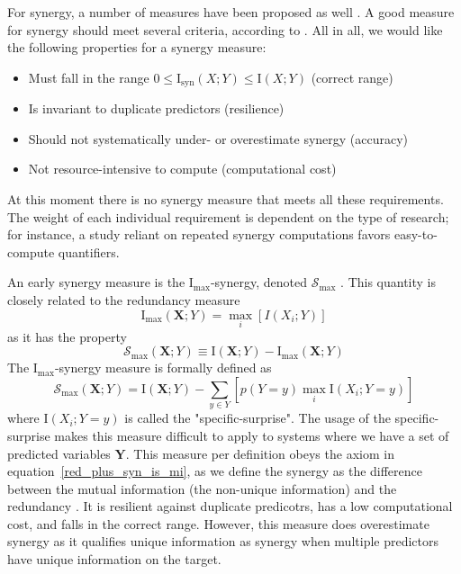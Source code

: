 \documentclass[../main.tex]{subfiles}
\begin{document}
For synergy, a number of measures have been proposed as well \cite{griffith2014quantifying, olbrich2015information}.
A good measure for synergy should meet several criteria, according to \cite{griffith2014quantifying}.
All in all, we would like the following properties for a synergy measure:
%
\begin{itemize}
\item Must fall in the range $0 \le \mathrm{I}_\mathrm{syn}(X;Y) \le \mathrm{I} (X;Y)$ (correct range)
\item Is invariant to duplicate predictors (resilience)
\item Should not systematically under- or overestimate synergy (accuracy)
\item Not resource-intensive to compute (computational cost)
\end{itemize}
%
At this moment there is no synergy measure that meets all these requirements.
The weight of each individual requirement is dependent on the type of research; for instance, a study reliant on repeated synergy computations favors easy-to-compute quantifiers.

An early synergy measure is the $\mathrm{I}_\mathrm{max}$-synergy, denoted $\mathcal{S}_\mathrm{max}$ \cite{williams2010nonnegative}.
This quantity is closely related to the redundancy measure
%
\begin{equation}
\mathrm{I}_\mathrm{max} (\mathbf{X};Y) = \max_i [I(X_{i};Y)]
\end{equation}
%
as it has the property
%
\begin{equation}
\mathcal{S}_\mathrm{max} (\mathbf{X};Y) \equiv \mathrm{I}(\mathbf{X};Y) - \mathrm{I}_\mathrm{max} (\mathbf{X};Y)
\end{equation}
%
The $\mathrm{I}_\mathrm{max}$-synergy measure is formally defined as
%
\begin{equation}
\mathcal{S}_\mathrm{max} (\mathbf{X};Y) = \mathrm{I}(\mathbf{X};Y) - \sum_{y \in Y} [ p(Y = y) \max_i \mathrm{I} (X_i ; Y = y) ]
\end{equation}
%
where $\mathrm{I} (X_i ; Y = y)$ is called the "specific-surprise".
The usage of the specific-surprise makes this measure difficult to apply to systems where we have a set of predicted variables $\mathbf{Y}$.
This measure per definition obeys the axiom in equation~\ref{red_plus_syn_is_mi}, as we define the synergy as the difference between the mutual information (the non-unique information) and the redundancy \cite{griffith2014quantifying}.
It is resilient against duplicate predicotrs, has a low computational cost, and falls in the correct range.
However, this measure does overestimate synergy as it qualifies unique information as synergy when multiple predictors have unique information on the target.
\end{document}
